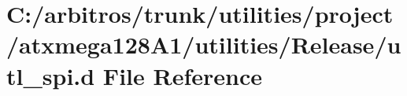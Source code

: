 \hypertarget{utilities_2project_2atxmega128_a1_2utilities_2_release_2utl__spi_8d}{\section{C\-:/arbitros/trunk/utilities/project/atxmega128\-A1/utilities/\-Release/utl\-\_\-spi.d File Reference}
\label{utilities_2project_2atxmega128_a1_2utilities_2_release_2utl__spi_8d}
}
